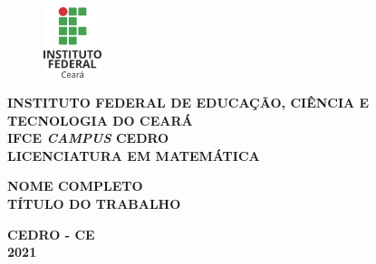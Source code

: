 \begin{titlepage}
  \begin{figure}[htb]			
	  \centering
	  \includegraphics[width=0.15\textwidth]{figuras/ifce.png}
  \end{figure}
  \begin{center}
    \textbf{INSTITUTO FEDERAL DE EDUCAÇÃO, CIÊNCIA E TECNOLOGIA DO CEARÁ}\\
    \textbf{IFCE \textit{CAMPUS} CEDRO}\\
    \textbf{LICENCIATURA EM MATEMÁTICA}\\

  \end{center}

 
\centering
	\begin{center}
	
		\vfill
		\textbf{NOME COMPLETO \\} 
\vfill
		\textbf{TÍTULO DO TRABALHO}\\
		
		
		
		
	\end{center}
	 \vfill
		
			\textbf{CEDRO - CE \\ 2021}
\end{titlepage}
